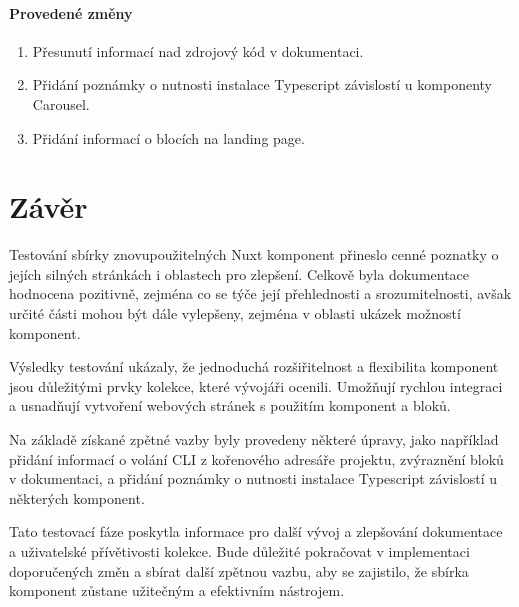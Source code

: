 \paragraph{Provedené změny}
\begin{enumerate}
  \item Přesunutí informací nad zdrojový kód v dokumentaci.
  \item Přidání poznámky o nutnosti instalace Typescript závislostí u komponenty Carousel.
  \item Přidání informací o blocích na landing page.
\end{enumerate}

\section{Závěr}
Testování sbírky znovupoužitelných Nuxt komponent přineslo cenné poznatky o jejích silných stránkách i oblastech pro zlepšení. Celkově byla dokumentace hodnocena pozitivně, zejména co se týče její přehlednosti a srozumitelnosti, avšak určité části mohou být dále vylepšeny, zejména v oblasti ukázek možností komponent.

Výsledky testování ukázaly, že jednoduchá rozšiřitelnost a flexibilita komponent jsou důležitými prvky kolekce, které vývojáři ocenili. Umožňují rychlou integraci a usnadňují vytvoření webových stránek s použitím komponent a bloků.

Na základě získané zpětné vazby byly provedeny některé úpravy, jako například přidání informací o volání CLI z kořenového adresáře projektu, zvýraznění bloků v dokumentaci, a přidání poznámky o nutnosti instalace Typescript závislostí u některých komponent.

Tato testovací fáze poskytla informace pro další vývoj a zlepšování dokumentace a uživatelské přívětivosti kolekce. Bude důležité pokračovat v implementaci doporučených změn a sbírat další zpětnou vazbu, aby se zajistilo, že sbírka komponent zůstane užitečným a efektivním nástrojem.
